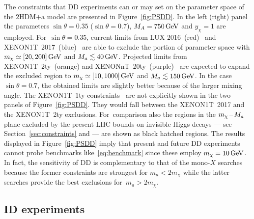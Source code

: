 \documentclass[a4paper, 11pt,notoc]{article}
\newcommand{\hdma}{\ensuremath{\textrm{2HDM+a}}\xspace}
\begin{document}
The constraints that DD experiments can or may set on the parameter space of the \hdma model are presented in Figure~\ref{fig:PSDD}. In the left (right) panel the parameters $\sin \theta = 0.35$ ($\sin \theta = 0.7$), $M_A = 750 \, {\rm GeV}$ and $y_\chi = 1$ are employed. For~$\sin \theta = 0.35$,  current limits from LUX 2016~(red)~\cite{Akerib:2016vxi} and  XENON1T~2017~(blue)~\cite{Aprile:2017iyp} are able to exclude the portion of parameter space with $m_\chi \simeq [20, 200 ]\, {\rm GeV}$ and $M_a \lesssim 40 \, {\rm GeV}$. Projected limits from XENON1T~2ty~(orange) and XENONnT~20ty~(purple)~\cite{Aprile:2015uzo} are expected to expand the excluded region to $m_\chi \simeq [10, 1000 ]\, {\rm GeV}$ and $M_a \lesssim 150 \, {\rm GeV}$. In the case $\sin \theta = 0.7$, the obtained limits are slightly better because of the larger mixing angle.  The XENON1T~1ty constraints~\cite{Aprile:2018dbl} are not explicitly shown  in the two panels of Figure~\ref{fig:PSDD}. They would fall between the  XENON1T~2017 and the XENON1T~2ty exclusions. For~comparison also the regions in the $m_\chi \hspace{0.5mm}$--$\hspace{0.5mm} M_a$ plane excluded by the present  LHC bounds on invisible Higgs decays --- see Section~\ref{sec:constraints} and \cite{Bauer:2017ota} --- are shown as black hatched regions.  The results displayed in Figure~\ref{fig:PSDD} imply that present and future DD experiments cannot probe benchmarks like~\eqref{eq:benchmark} since these employ $m_\chi = 10 \, {\rm GeV}$. In fact, the sensitivity of DD is complementary to that of the mono-$X$ searches because the former constraints are strongest for $m_a < 2 m_\chi$ while the latter searches provide the best exclusions for~$m_a > 2 m_\chi$. 

\subsection{ID experiments}
\end{document}
